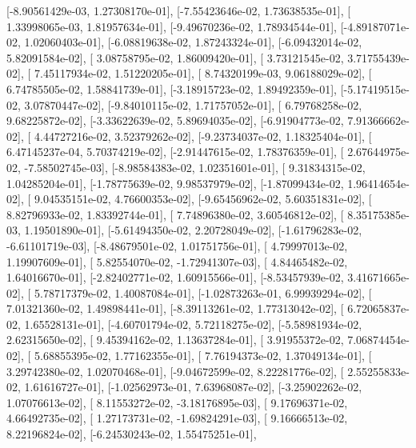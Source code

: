 \documentclass{article}
\begin{document}
       [-8.90561429e-03,  1.27308170e-01],
       [-7.55423646e-02,  1.73638535e-01],
       [ 1.33998065e-03,  1.81957634e-01],
       [-9.49670236e-02,  1.78934544e-01],
       [-4.89187071e-02,  1.02060403e-01],
       [-6.08819638e-02,  1.87243324e-01],
       [-6.09432014e-02,  5.82091584e-02],
       [ 3.08758795e-02,  1.86009420e-01],
       [ 3.73121545e-02,  3.71755439e-02],
       [ 7.45117934e-02,  1.51220205e-01],
       [ 8.74320199e-03,  9.06188029e-02],
       [ 6.74785505e-02,  1.58841739e-01],
       [-3.18915723e-02,  1.89492359e-01],
       [-5.17419515e-02,  3.07870447e-02],
       [-9.84010115e-02,  1.71757052e-01],
       [ 6.79768258e-02,  9.68225872e-02],
       [-3.33622639e-02,  5.89694035e-02],
       [-6.91904773e-02,  7.91366662e-02],
       [ 4.44727216e-02,  3.52379262e-02],
       [-9.23734037e-02,  1.18325404e-01],
       [ 6.47145237e-04,  5.70374219e-02],
       [-2.91447615e-02,  1.78376359e-01],
       [ 2.67644975e-02, -7.58502745e-03],
       [-8.98584383e-02,  1.02351601e-01],
       [ 9.31834315e-02,  1.04285204e-01],
       [-1.78775639e-02,  9.98537979e-02],
       [-1.87099434e-02,  1.96414654e-02],
       [ 9.04535151e-02,  4.76600353e-02],
       [-9.65456962e-02,  5.60351831e-02],
       [ 8.82796933e-02,  1.83392744e-01],
       [ 7.74896380e-02,  3.60546812e-02],
       [ 8.35175385e-03,  1.19501890e-01],
       [-5.61494350e-02,  2.20728049e-02],
       [-1.61796283e-02, -6.61101719e-03],
       [-8.48679501e-02,  1.01751756e-01],
       [ 4.79997013e-02,  1.19907609e-01],
       [ 5.82554070e-02, -1.72941307e-03],
       [ 4.84465482e-02,  1.64016670e-01],
       [-2.82402771e-02,  1.60915566e-01],
       [-8.53457939e-02,  3.41671665e-02],
       [ 5.78717379e-02,  1.40087084e-01],
       [-1.02873263e-01,  6.99939294e-02],
       [ 7.01321360e-02,  1.49898441e-01],
       [-8.39113261e-02,  1.77313042e-02],
       [ 6.72065837e-02,  1.65528131e-01],
       [-4.60701794e-02,  5.72118275e-02],
       [-5.58981934e-02,  2.62315650e-02],
       [ 9.45394162e-02,  1.13637284e-01],
       [ 3.91955372e-02,  7.06874454e-02],
       [ 5.68855395e-02,  1.77162355e-01],
       [ 7.76194373e-02,  1.37049134e-01],
       [ 3.29742380e-02,  1.02070468e-01],
       [-9.04672599e-02,  8.22281776e-02],
       [ 2.55255833e-02,  1.61616727e-01],
       [-1.02562973e-01,  7.63968087e-02],
       [-3.25902262e-02,  1.07076613e-02],
       [ 8.11553272e-02, -3.18176895e-03],
       [ 9.17696371e-02,  4.66492735e-02],
       [ 1.27173731e-02, -1.69824291e-03],
       [ 9.16666513e-02,  8.22196824e-02],
       [-6.24530243e-02,  1.55475251e-01],
\end{document}
